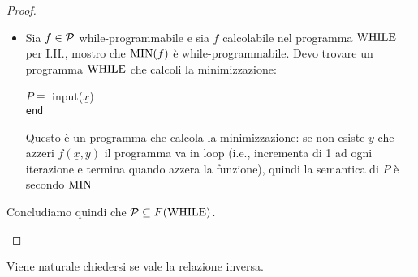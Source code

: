 \begin{proof}
\begin{itemize}
\begin{itemize}
        	\item Sia $f \in \mathcal{P}$ while-programmabile e sia $f$ calcolabile nel programma $\text{WHILE}$ per I.H., mostro che $\operatorname{MIN}(f)$ è while-programmabile. Devo trovare un programma $\text{WHILE}$ che calcoli la minimizzazione:
			\begin{center}
				\begin{minipage}{.85\textwidth}
					\begin{tcolorbox}[colback=white,sharp corners,boxrule=.3mm]
						\begin{algorithm}[H]
							\SetAlgoNoEnd
							$P \equiv$ input($\underline{x}$) \\
							\texttt{end}
						\end{algorithm}
					\end{tcolorbox} 
				\end{minipage}
			\end{center}
			Questo è un programma che calcola la minimizzazione: se non esiste $y$ che azzeri $f(\underline{x}, y)$ il programma va in loop (i.e., incrementa di 1 ad ogni iterazione e termina quando azzera la funzione), quindi la semantica di $P$ è $\bot$ secondo $\operatorname{MIN}$
		\end{itemize}
        
		Concludiamo quindi che $\mathcal{P} \subseteq F(\text{WHILE})$.
	\end{itemize}
  \end{proof}

\vspace{-0.5cm}

Viene naturale chiedersi se vale la relazione inversa.

